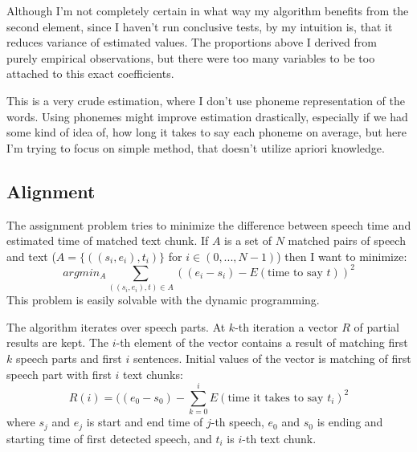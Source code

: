 \documentclass[12pt,a4paper,english]{article}
\begin{document}
Although I'm not completely certain in what way my algorithm benefits from the second element,
since I haven't run conclusive tests, by my intuition is, that it reduces variance of estimated values. \newline
The proportions above I derived from purely empirical observations, but there were too many variables to be
too attached to this exact coefficients. \newline

This is a very crude estimation, where I don't use phoneme representation of the words. Using phonemes might improve estimation drastically,
especially if we had some kind of idea of, how long it takes to say each phoneme on average, but here I'm trying to focus on simple method, that doesn't utilize apriori knowledge.

\newpage

\subsection{Alignment}

The assignment problem tries to minimize the difference between speech time and estimated time of matched text chunk.
If $A$ is a set of $N$ matched pairs of speech and text ($A = \{((s_i, e_i), t_i)\}$ for $i \in (0, ..., N-1)$) then I want to minimize:
\begin{equation}
    argmin_A \sum_{((s_i, e_i), t) \in A} ((e_i - s_i) - E(\text{time to say $t$}))^2
\end{equation}
This problem is easily solvable with the dynamic programming. \newline

The algorithm iterates over speech parts. \newline
At $k$-th iteration a vector $R$ of partial results are kept. The $i$-th element of the vector contains a result of matching first $k$ speech parts and first $i$ sentences. \newline
Initial values of the vector is matching of first speech part with first $i$ text chunks:
\begin{equation}
    R(i) = ((e_0 - s_0) - \sum_{k = 0}^i E(\text{time it takes to say $t_i$})^2
\end{equation}
where $s_j$ and $e_j$ is start and end time of $j$-th speech, \newline
$e_0$ and $s_0$ is ending and starting time of first detected speech,
and $t_i$ is $i$-th text chunk. \newline
               
\end{document}
